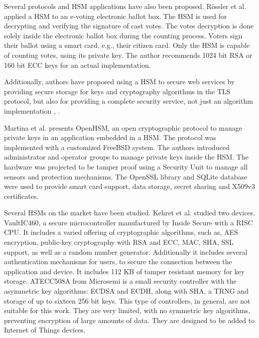 Several protocols and HSM applications have also been proposed.
Rössler et al. \cite{rossler2005voting} applied a HSM to an e-voting electronic ballot box. The HSM is used for decrypting and verifying the signature of cast votes.
The votes decryption is done solely inside the electronic ballot box during the counting process.
Voters sign their ballot using a smart card, e.g., their citizen card.
Only the HSM is capable of counting votes, using its private key.
The author recommends 1024 bit RSA or 160 bit ECC keys for an actual implementation.

Additionally, authors have proposed using a HSM to secure web services by providing secure storage for keys and cryptography algorithms in the TLS protocol, but also for providing a complete security service, not just an algorithm implementation \cite{baldwin2003hardware}, \cite{mont2003secure}.

Martina et al. \cite{openhsm} presents OpenHSM, an open cryptographic protocol to manage private keys in an application embedded in a HSM.
The protocol was implemented with a customized FreeBSD system. The authors introduced administrator and operator groups to manage
private keys inside the HSM. The hardware was projected to be tamper proof using a Security Unit to manage all sensors and protection mechanisms.
The OpenSSL library and SQLite database were used to provide smart card support, data storage, secret sharing and X509v3 certificates.

Several HSMs on the market have been studied.
Kehret et al. \cite{tlsintegration} studied two devices. VaultIC460, a secure microcontroller manufactured by Inside Secure with a RISC CPU. It includes a varied offering of cryptographic algorithms, such as, AES encryption, public-key cryptography with RSA and ECC, MAC, SHA, SSL support, as well as a random number generator. Additionally it includes several authentication mechanisms for users, to secure the connection between the application and device.
It includes 112 KB of tamper resistant memory for key storage.
ATECC508A from Microsemi is a small security controller with the asymmetric key algorithms: ECDSA and ECDH, along with SHA, a TRNG and storage of up to sixteen 256 bit keys.
This type of controllers, in general, are not suitable for this work. They are very limited, with no symmetric key algorithms, preventing encryption of large amounts of data. They are designed to be added to Internet of Things devices.

